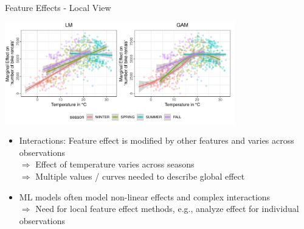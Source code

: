 \documentclass[11pt,compress,t,notes=noshow, aspectratio=169, xcolor=table]{beamer}
\begin{document}
\begin{frame}{Feature Effects - Local View}

\centerline{\includegraphics[width=0.75\textwidth, trim=0cm 0.1cm 0cm 0cm, clip]{figure/lm_main_interactions}}

\begin{itemize}
    \item Interactions: Feature effect is modified by other features and varies across observations \\ 
    $\Rightarrow$ Effect of temperature varies across seasons\\
    $\Rightarrow$ Multiple values / curves needed to describe global effect
    \item ML models often model non-linear effects and complex interactions \\
    $\Rightarrow$ Need for local feature effect methods, e.g., analyze effect for individual observations
\end{itemize}




\end{frame}

%
%
%
%
%
%
\end{document}
